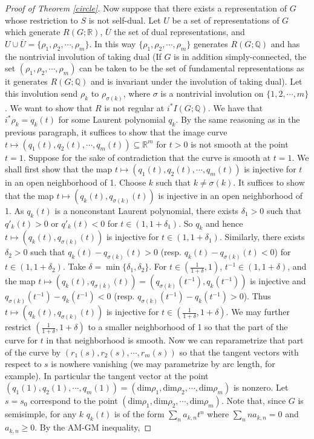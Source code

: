 \documentclass[10pt,a4paper]{amsart}
\begin{document}
\begin{proof}[Proof of Theorem \ref{circle}]
Now suppose that there exists a representation of $G$ whose restriction to $S$ is not self-dual. Let $U$ be a set of representations of $G$ which generate $R(G; \mathbb{R})$, $\overline{U}$ the set of dual representations, and $U\cup \overline{U}=\{\rho_1, \rho_2, \cdots, \rho_m\}$. In this way $\{\rho_1, \rho_2, \cdots, \rho_m\}$ generates $R(G; \mathbb{Q})$ and has the nontrivial involution of taking dual (If $G$ is in addition simply-connected, the set $(\rho_1, \rho_2, \cdots, \rho_m)$ can be taken to be the set of fundamental representations as it generates $R(G; \mathbb{Q})$ and is invariant under the involution of taking dual). Let this involution send $\rho_k$ to $\rho_{\sigma(k)}$, where $\sigma$ is a nontrivial involution on $\{1, 2, \cdots, m\}$. We want to show that $R$ is not regular at $i^*I(G; \mathbb{Q})$. We have that $i^*\rho_k=q_k(t)$ for some Laurent polynomial $q_k$. By the same reasoning as in the previous paragraph, it suffices to show that the image curve $t\mapsto (q_1(t), q_2(t), \cdots, q_m(t))\subseteq \mathbb{R}^m$ for $t>0$ is not smooth at the point $t=1$. Suppose for the sake of contradiction that the curve is smooth at $t=1$. We shall first show that the map $t\mapsto (q_1(t), q_2(t), \cdots, q_m(t))$ is injective for $t$ in an open neighborhood of 1. Choose $k$ such that $k\neq \sigma(k)$. It suffices to show that the map $t\mapsto(q_k(t), q_{\sigma(k)}(t))$ is injective in an open neighborhood of 1. As $q_k(t)$ is a nonconstant Laurent polynomial, there exists $\delta_1>0$ such that $q'_k(t)>0$ or $q'_k(t)<0$ for $t\in(1, 1+\delta_1)$. So $q_k$ and hence $t\mapsto(q_k(t), q_{\sigma(k)}(t))$ is injective for $t\in(1, 1+\delta_1)$. Similarly, there exists $\delta_2>0$ such that $q_k(t)-q_{\sigma(k)}(t)>0$ (resp. $q_k(t)-q_{\sigma(k)}(t)<0$) for $t\in(1, 1+\delta_2)$. Take $\delta=\min\{\delta_1, \delta_2\}$. For $\displaystyle t\in\left(\frac{1}{1+\delta}, 1\right)$, $t^{-1}\in(1, 1+\delta)$, and the map $t\mapsto(q_k(t), q_{\sigma(k)}(t))=(q_{\sigma(k)}(t^{-1}), q_k(t^{-1}))$ is injective and $q_{\sigma(k)}(t^{-1})-q_k(t^{-1})<0$ (resp. $q_{\sigma(k)}(t^{-1})-q_k(t^{-1})>0$). Thus $t\mapsto (q_k(t), q_{\sigma(k)}(t))$ is injective for $\displaystyle t\in\left(\frac{1}{1+\delta}, 1+\delta\right)$. We may further restrict $\displaystyle\left(\frac{1}{1+\delta}, 1+\delta\right)$ to a smaller neighborhood of 1 so that the part of the curve for $t$ in that neighborhood is smooth. Now we can reparametrize that part of the curve by $(r_1(s), r_2(s), \cdots, r_m(s))$ so that the tangent vectors with respect to $s$ is nowhere vanishing (we may parametrize by arc length, for example). In particular the tangent vector at the point $(q_1(1), q_2(1), \cdots, q_m(1))=(\text{dim}\rho_1, \text{dim}\rho_2, \cdots, \text{dim}\rho_m)$ is nonzero. Let $s=s_0$ correspond to the point $(\text{dim}\rho_1, \text{dim}\rho_2, \cdots, \text{dim}\rho_m)$. Note that, since $G$ is semisimple, for any $k$ $q_k(t)$ is of the form $\displaystyle\sum_n a_{k, n}t^n$ where $\displaystyle\sum_n na_{k, n}=0$ and $a_{k, n}\geq 0$. By the AM-GM inequality, 

\end{proof}
\end{document}
